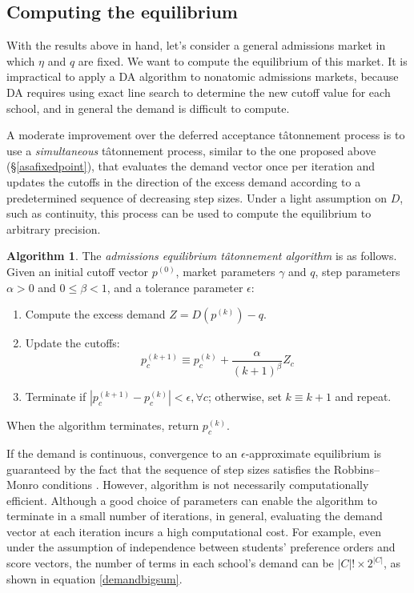 \documentclass[12pt]{article}
\theoremstyle{definition}
\newtheorem{algorithm}{Algorithm}
\begin{document}
\subsection{Computing the equilibrium} \label{computingtheeq}
With the results above in hand, let's consider a general admissions market in which $\eta$ and $q$ are fixed. We want to compute the equilibrium of this market. It is impractical to apply a DA algorithm to nonatomic admissions markets, because DA requires using exact line search to determine the new cutoff value for each school, and in general the demand is difficult to compute.

A moderate improvement over the deferred acceptance t\^{a}tonnement process is to use a \emph{simultaneous} t\^{a}tonnement process, similar to the one proposed above (\S\ref{asafixedpoint}), that evaluates the demand vector once per iteration and updates the cutoffs in the direction of the excess demand according to a predetermined sequence of decreasing step sizes. Under a light assumption on $D$, such as continuity, this process can be used to compute the equilibrium to arbitrary precision.
\begin{algorithm} \label{admissionseqtatalgo}
The \emph{admissions equilibrium t\^{a}tonnement algorithm} is as follows. Given an initial cutoff vector $p^{(0)}$, market parameters $\gamma$ and $q$, step parameters $\alpha >0$ and $0 \leq \beta < 1$, and a tolerance parameter $\epsilon$:
\begin{enumerate}
\item Compute the excess demand $Z = D (p^{(k)}) - q$. 
\item Update the cutoffs:
\[ p_c^{(k+1)} \equiv p_c^{(k)} + \frac{\alpha}{(k+1)^\beta} Z_c\]
\item Terminate if $| p_c^{(k+1)} - p_c^{(k)} | < \epsilon, \forall c$; otherwise, set $k \equiv k+1$ and repeat. 
\end{enumerate}
When the algorithm terminates, return $p_c^{(k)}$. 
\end{algorithm}
If the demand is continuous, convergence to an $\epsilon$-approximate equilibrium is guaranteed by the fact that the sequence of step sizes satisfies the Robbins--Monro conditions \parencite[][]{robbinsmonro}. However, algorithm is not necessarily computationally efficient. Although a good choice of parameters can enable the algorithm to terminate in a small number of iterations, in general, evaluating the demand vector at each iteration incurs a high computational cost. For example, even under the assumption of independence between students' preference orders and score vectors, the number of terms in each school's demand can be $|C|! \times 2^{|C|}$, as shown in equation \eqref{demandbigsum}.
\end{document}
